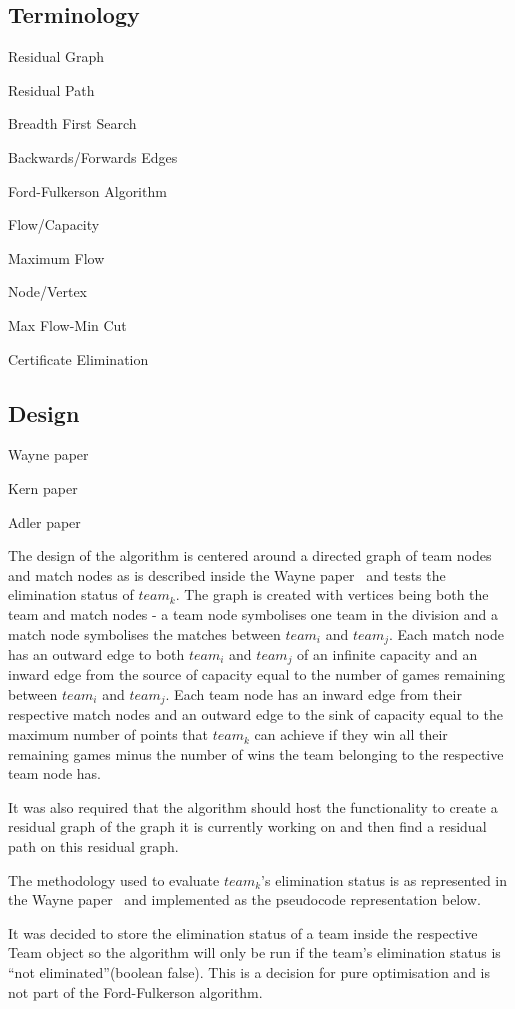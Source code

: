 \subsection{Terminology}
Residual Graph

Residual Path

Breadth First Search

Backwards/Forwards Edges

Ford-Fulkerson Algorithm

Flow/Capacity

Maximum Flow

Node/Vertex

Max Flow-Min Cut

Certificate Elimination

\subsection{Design}

Wayne paper~\cite{Wayne}

Kern paper~\cite{Kern}

Adler paper~\cite{Adler}

The design of the algorithm is centered around a directed graph of
team nodes and match nodes as is described inside the Wayne
paper~\cite{Wayne} and tests the elimination status of $team_k$. The
graph is created with vertices being both the team and match nodes - a
team node symbolises one team in the division and a match node
symbolises the matches between $team_i$ and $team_j$. Each match node
has an outward edge to both $team_i$ and $team_j$ of an infinite
capacity and an inward edge from the source of capacity equal to the
number of games remaining between $team_i$ and $team_j$. Each team
node has an inward edge from their respective match nodes and an
outward edge to the sink of capacity equal to the maximum number of
points that $team_k$ can achieve if they win all their remaining games
minus the number of wins the team belonging to the respective team
node has. 

It was also required that the algorithm should host the functionality
to create a residual graph of the graph it is currently working on and
then find a residual path on this residual graph.

The methodology used to evaluate $team_k$'s elimination status is as
represented in the Wayne paper~\cite{Wayne} and implemented as the
pseudocode representation below. 

It was decided to store the elimination status of a team inside the
respective Team object so the algorithm will only be run if the team's
elimination status is ``not eliminated''(boolean false). This is a
decision for pure optimisation and is not part of the Ford-Fulkerson
algorithm.

